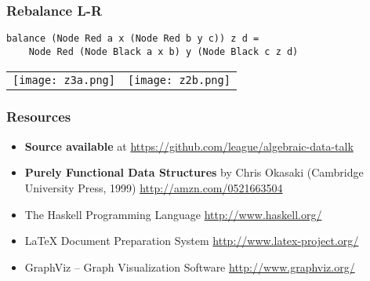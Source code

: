 \documentclass[14pt,t,usepdftitle=false,
xcolornames=x11names,svgnames,dvipsnames]{beamer}
\begin{document}
\begin{frame}[fragile]
  \frametitle{Rebalance L-R}
\begin{lstlisting}
balance (Node Red a x (Node Red b y c)) z d =
    Node Red (Node Black a x b) y (Node Black c z d)
\end{lstlisting}
  \begin{tabular}{cc}
  \texttt{[image: z3a.png]}
  &
  \texttt{[image: z2b.png]}
  \end{tabular}
\end{frame}

\begin{frame}
  \frametitle{Resources}
  \begin{itemize}
  \item \textbf{Source available} at
    \url{https://github.com/league/algebraic-data-talk}
  \item \textbf{Purely Functional Data Structures} by Chris Okasaki
    (Cambridge University Press, 1999)
    \url{http://amzn.com/0521663504}
  \item The Haskell Programming Language \url{http://www.haskell.org/}
  \item \LaTeX{} Document Preparation System
    \url{http://www.latex-project.org/}
  \item GraphViz -- Graph Visualization Software
    \url{http://www.graphviz.org/}
  \end{itemize}
\end{frame}

\end{document}

